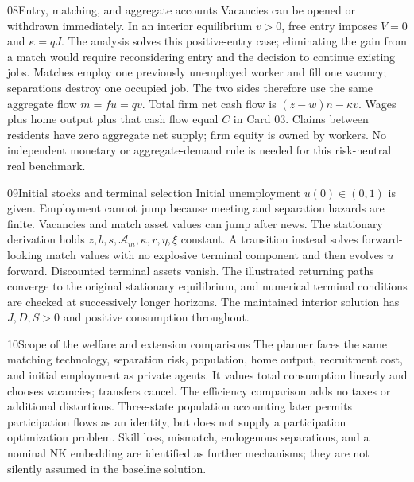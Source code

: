 \begin{modelsetup}[1]
\begin{modelcondition}{08}{Entry, matching, and aggregate accounts}
Vacancies can be opened or withdrawn immediately. In an interior equilibrium
$v>0$, free entry imposes $V=0$ and $\kappa=qJ$. The analysis solves this
positive-entry case; eliminating the gain from a match would require
reconsidering entry and the decision to continue existing jobs.
Matches employ one previously unemployed worker
and fill one vacancy; separations destroy one occupied job. The two sides
therefore use the same aggregate flow $m=fu=qv$. Total firm net cash flow is
$(z-w)n-\kappa v$. Wages plus home output plus that cash flow equal $C$ in
Card 03. Claims between residents have zero aggregate net supply; firm equity
is owned by workers. No independent monetary or aggregate-demand rule is
needed for this risk-neutral real benchmark.
\end{modelcondition}
\end{modelsetup}

\begin{modelsetup}[1]
\begin{modelcondition}{09}{Initial stocks and terminal selection}
Initial unemployment $u(0)\in(0,1)$ is given. Employment cannot jump because
meeting and separation hazards are finite. Vacancies and match asset values
can jump after news. The stationary derivation holds $z,b,s,\mathcal A_m,
\kappa,r,\eta,\xi$ constant. A transition instead solves forward-looking match
values with no explosive terminal component and then evolves $u$ forward.
Discounted terminal assets vanish. The illustrated returning paths converge
to the original stationary equilibrium, and numerical terminal conditions are
checked at successively longer horizons. The maintained interior solution has
$J,D,S>0$ and positive consumption throughout.
\end{modelcondition}
\end{modelsetup}

\begin{modelsetup}[1]
\begin{modelcondition}{10}{Scope of the welfare and extension comparisons}
The planner faces the same matching technology, separation risk, population,
home output, recruitment cost, and initial employment as private agents.
It values total consumption linearly and chooses vacancies; transfers cancel.
The efficiency comparison adds no taxes or additional distortions. Three-state
population accounting later permits participation flows as an identity, but
does not supply a participation optimization problem. Skill loss, mismatch,
endogenous separations, and a nominal NK embedding are identified as further
mechanisms; they are not silently assumed in the baseline solution.
\end{modelcondition}
\end{modelsetup}

